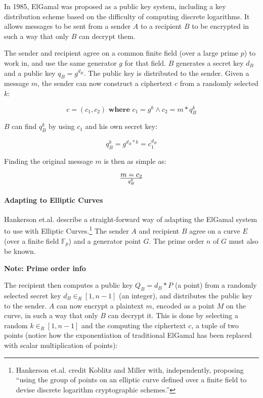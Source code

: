 \label{sec:math_encryption_elgamal}

In 1985, ElGamal was proposed as a public key system, including a key distribution scheme based
on the difficulty of computing discrete logarithms. It allows messages to be sent from a sender
\(A\) to a recipient \(B\) to be encrypted in such a way that only \(B\) can decrypt them.

The sender and recipient agree on a common finite field (over a large prime \(p\)) to work in,
and use the same generator \(g\) for that field. \(B\) generates a secret key \(d_B\) and a public
key \(q_B = g^{d_B}\). The public key is distributed to the sender. Given a message \(m\), the
sender can now construct a ciphertext \(c\) from a randomly selected \(k\):\cite{elgamal}

\begin{equation}
	c = (c_1, c_2)  \textbf{ where }  c_1 = g^k \land c_2 = m * q_B^k
\end{equation}

\(B\) can find \(q_B^k\) by using \(c_1\) and his own secret key:

\begin{equation}
	q_B^k = g^{d_B*k} = c_1^{d_B}
\end{equation}

Finding the original message \(m\) is then as simple as:

\begin{equation}
    m = c_2 \over q_B^k
\end{equation}

\paragraph{Adapting to Elliptic Curves}
Hankerson et.al. describe a straight-forward way of adapting the ElGamal system to use with
Elliptic Curves.\footnote{Hankerson et.al. credit Koblitz and Miller with, independently, proposing
``using the group of points on an elliptic curve defined over a finite field to devise discrete
logarithm cryptographic schemes.''\cite{hankerson2010}} The sender \(A\) and recipient \(B\) agree on a curve \(E\)
(over a finite field \(\mathbb{F}_p\)) and a generator point \(G\). The prime order \(n\) of \(G\) must also be
known.

\textbf{Note: Prime order info}

The recipient then computes a public key \(Q_B = d_B * P\) (a point) from a randomly selected secret key
\(d_B \in_R [1,n-1]\) (an integer), and distributes the public key to the sender. \(A\) can now encrypt
a plaintext \(m\), encoded as a point \(M\) on the curve, in such a way that only \(B\) can decrypt
it. This is done by selecting a random \(k \in_R [1,n-1]\) and the computing the ciphertext \(c\), a
tuple of two points (notice how the exponentiation of traditional ElGamal has been replaced with scalar
multiplication of points):

